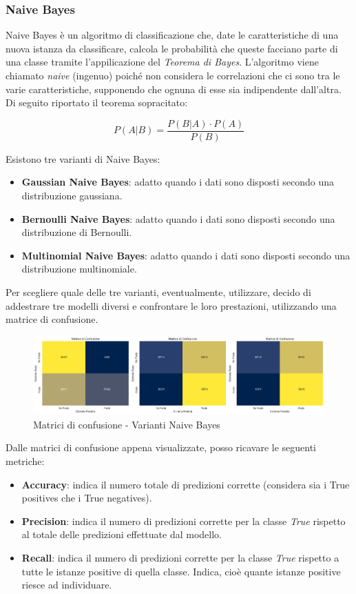 \documentclass[]{article}
\begin{document}
        \subsubsection{Naive Bayes}
            Naive Bayes è un algoritmo di classificazione che, date le caratteristiche di una nuova istanza da classificare, calcola le probabilità che queste facciano parte di una classe tramite l'appilicazione del \textit{Teorema di Bayes}. L'algoritmo viene chiamato \textit{naive} (ingenuo) poiché non considera le correlazioni che ci sono tra le varie caratteristiche, supponendo che ognuna di esse sia indipendente dall'altra. Di seguito riportato il teorema sopracitato:
            \begin{center}
            \[
                P(A|B) = \frac{P(B|A) \cdot P(A)}{P(B)}
            \]
        \end{center}
        Esistono tre varianti di Naive Bayes:
        \begin{itemize}
            \item \textbf{Gaussian Naive Bayes}: adatto quando i dati sono disposti secondo una distribuzione gaussiana.
            \item \textbf{Bernoulli Naive Bayes}: adatto quando i dati sono disposti secondo una distribuzione di Bernoulli.
            \item \textbf{Multinomial Naive Bayes}: adatto quando i dati sono disposti secondo una distribuzione multinomiale.
        \end{itemize}
        Per scegliere quale delle tre varianti, eventualmente, utilizzare, decido di addestrare tre modelli diversi e confrontare le loro prestazioni, utilizzando una matrice di confusione.
        \begin{figure}[H]
            \centering
            \includegraphics[width=1\textwidth]{img/ConfrontoMatrici.png}
            \caption[short]{Matrici di confusione - Varianti Naive Bayes}
        \end{figure}
        Dalle matrici di confusione appena visualizzate, posso ricavare le seguenti metriche:
        \begin{itemize}
            \item \textbf{Accuracy}: indica il numero totale di predizioni corrette (considera sia i True positives che i True negatives).
            \item \textbf{Precision}: indica il numero di predizioni corrette per la classe \textit{True} rispetto al totale delle predizioni effettuate dal modello.
            \item \textbf{Recall}: indica il numero di predizioni corrette per la classe \textit{True} rispetto a tutte le istanze positive di quella classe. Indica, cioè quante istanze positive riesce ad individuare.
        \end{itemize}
\end{document}
